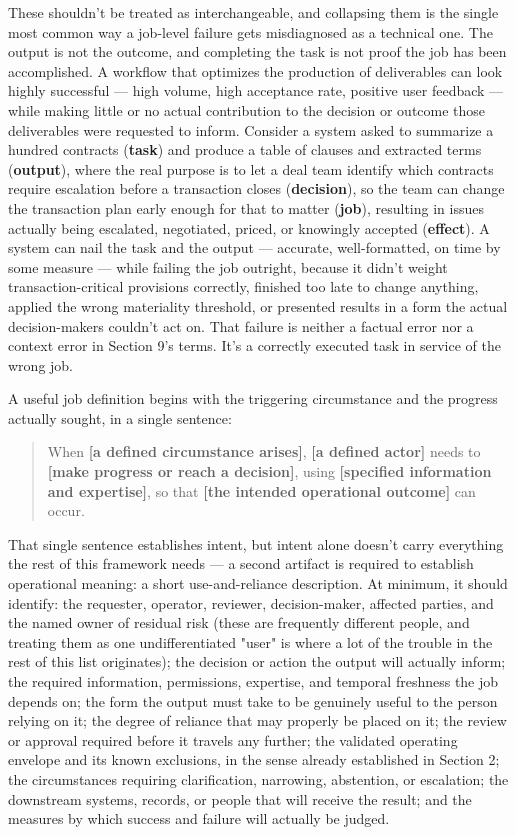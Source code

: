 These shouldn't be treated as interchangeable, and collapsing them is the single most common way a job-level failure gets misdiagnosed as a technical one. The output is not the outcome, and completing the task is not proof the job has been accomplished. A workflow that optimizes the production of deliverables can look highly successful --- high volume, high acceptance rate, positive user feedback --- while making little or no actual contribution to the decision or outcome those deliverables were requested to inform. Consider a system asked to summarize a hundred contracts (\textbf{task}) and produce a table of clauses and extracted terms (\textbf{output}), where the real purpose is to let a deal team identify which contracts require escalation before a transaction closes (\textbf{decision}), so the team can change the transaction plan early enough for that to matter (\textbf{job}), resulting in issues actually being escalated, negotiated, priced, or knowingly accepted (\textbf{effect}). A system can nail the task and the output --- accurate, well-formatted, on time by some measure --- while failing the job outright, because it didn't weight transaction-critical provisions correctly, finished too late to change anything, applied the wrong materiality threshold, or presented results in a form the actual decision-makers couldn't act on. That failure is neither a factual error nor a context error in Section 9's terms. It's a correctly executed task in service of the wrong job.

A useful job definition begins with the triggering circumstance and the progress actually sought, in a single sentence:

\begin{quote}
When \textbf{[a defined circumstance arises]}, \textbf{[a defined actor]} needs to \textbf{[make progress or reach a decision]}, using \textbf{[specified information and expertise]}, so that \textbf{[the intended operational outcome]} can occur.

\end{quote}

That single sentence establishes intent, but intent alone doesn't carry everything the rest of this framework needs --- a second artifact is required to establish operational meaning: a short use-and-reliance description. At minimum, it should identify: the requester, operator, reviewer, decision-maker, affected parties, and the named owner of residual risk (these are frequently different people, and treating them as one undifferentiated "user" is where a lot of the trouble in the rest of this list originates); the decision or action the output will actually inform; the required information, permissions, expertise, and temporal freshness the job depends on; the form the output must take to be genuinely useful to the person relying on it; the degree of reliance that may properly be placed on it; the review or approval required before it travels any further; the validated operating envelope and its known exclusions, in the sense already established in Section 2; the circumstances requiring clarification, narrowing, abstention, or escalation; the downstream systems, records, or people that will receive the result; and the measures by which success and failure will actually be judged.

